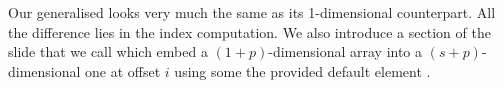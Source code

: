 Our generalised  looks very much the same as its 1-dimensional
counterpart.  All the difference lies in the index computation.  We also
introduce a section of the slide that we call  which embed
a $(1+p)$-dimensional array into a $(s+p)$-dimensional one at offset $i$
using some the provided default element .
\begin{mathpar}
\end{mathpar}
